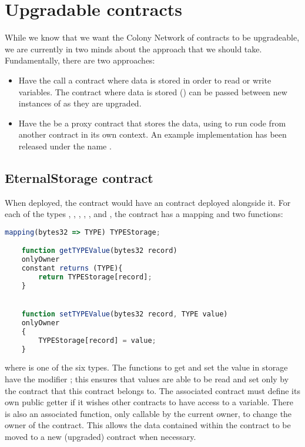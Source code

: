 \clearpage
\section{Upgradable contracts}\label{appendix:upgradability}

While we know that we want the Colony Network of contracts to be upgradeable, we are currently in two minds about the approach that we should take. Fundamentally, there are two approaches:

\begin{itemize}
    \item Have the  call a contract where data is stored in order to read or write variables. The contract where data is stored () can be passed between new instances of  as they are upgraded.
    \item Have the  be a proxy contract that stores the data, using  to run code from another contract in its own context. An example implementation has been released under the name  \cite{EtherRouter}.
\end{itemize}


\subsection {EternalStorage contract}

When deployed, the   contract would have an  contract deployed alongside it. For each of the types , , , , , and , the  contract has a mapping and two functions:

\begin{minipage}[c]{0.9\linewidth}
\begin{lstlisting}[language=JavaScript]
    mapping(bytes32 => TYPE) TYPEStorage;

    function getTYPEValue(bytes32 record)
    onlyOwner 
    constant returns (TYPE){
        return TYPEStorage[record];
    }


    function setTYPEValue(bytes32 record, TYPE value)
    onlyOwner
    {
        TYPEStorage[record] = value;
    }
\end{lstlisting}
\end{minipage}

\noindent where  is one of the six types. The functions to get and set the value in storage have the modifier ; this ensures that values are able to be read and set only by the contract that this  contract belongs to. The associated contract must define its own public getter if it wishes other contracts to have access to a variable. There is also an associated  function, only callable by the current owner, to change the owner of the contract. This allows the data contained within the contract to be moved to a new (upgraded) contract when necessary. 

